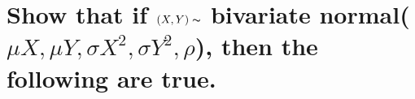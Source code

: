 \documentclass [12pt]{article}
\begin{document}
\begin{CJK*}{GBK}{kai}
\begin{enumerate}
\end{enumerate}
  
\section{Show that if $(X, Y ) \thicksim$ bivariate normal($\mu X , \mu Y , \sigma X^2 , \sigma Y^2 , \rho$), then the
following are true. }


  \end{CJK*}
\end{document}
